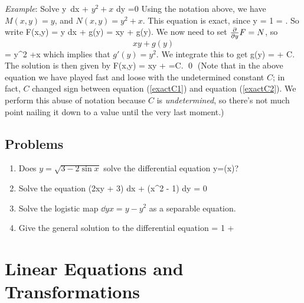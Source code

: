 \documentclass[12pt]{book}
\begin{document}
\noindent\emph{Example}: Solve
\bee
  y\, dx + \(y^2 + x \) dy =0
\eee
Using the notation above, we have $M(x,y)=y$, and $N(x,y)=y^2 +x$.
This equation is exact, since
\bee
  y = 1 = .
\eee
So write
\bee
  F(x,y)
  = \int y dx + g(y)
  = xy + g(y).
\eee
We now need to set $\frac{\partial }{\partial y} F = N$, so
\bee
  \[xy + g(y)\] = y^2 +x
\eee
which implies that $g'(y) = y^2$. We integrate this to get
\be \label{exactC1}
  g(y) =  + C.
\ee
The solution is then given by
\be \label{exactC2}
  F(x,y) = xy +  =C. \qed
\ee
(Note that in the above equation we have played fast and loose with the
undetermined constant $C$; in fact, $C$ changed sign between equation
(\ref{exactC1}) and equation (\ref{exactC2}). We perform this abuse of notation
because $C$ is \emph{undetermined}, so there's not much point nailing it
down to a value until the very last moment.)

\section{Problems}

\begin{enumerate}
\item
  Does $y = \sqrt{3-2\sin x}$ solve the differential equation
  \bee
  y=\sin(x)?
  \eee

\item
  Solve the equation
  \bee
  (2xy + 3) dx + (x^2 - 1) dy = 0
  \eee

\item
  Solve the logistic map $\dd{y}{x} = y - y^2$ as a separable equation.

\item
  Give the general solution to the differential equation
  \bee
   = 1 + 
  \eee

\end{enumerate}



\chapter{Linear Equations and Transformations}
\end{document}

